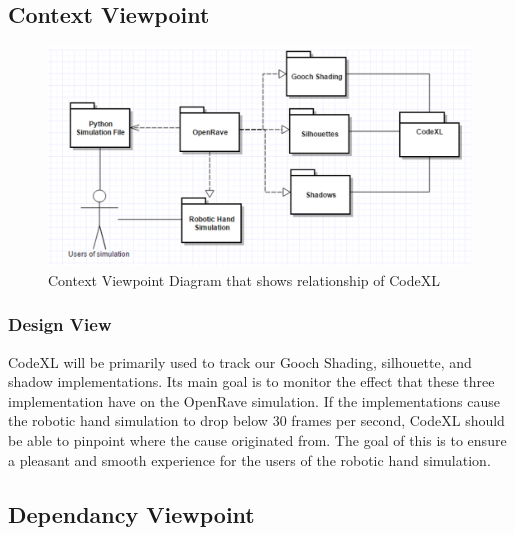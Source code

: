 ﻿\documentclass[10pt,journal,compsoc,draftclsnofoot]{IEEEtran}
\begin{document}
\begin{flushleft}
\subsection{Context Viewpoint}

\begin{figure} [H]
  \includegraphics[scale=0.9]{CodeXL_Context.eps}
  \caption
{ \newline \hspace{\linewidth}
Context Viewpoint Diagram that shows relationship of CodeXL}
  \label{fig:CodeXL_Context}
\end{figure}

\subsubsection{Design View}
CodeXL will be primarily used to track our Gooch Shading, silhouette, and shadow implementations.
Its main goal is to monitor the effect that these three implementation have on the OpenRave simulation.
If the implementations cause the robotic hand simulation to drop below 30 frames per second, CodeXL should be able to pinpoint where the cause originated from.
The goal of this is to ensure a pleasant and smooth experience for the users of the robotic hand simulation.

\subsection{Dependancy Viewpoint}


\end{flushleft}
\end{document}
